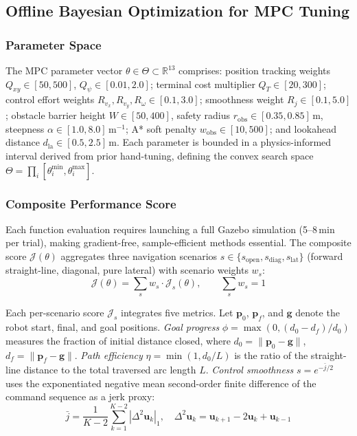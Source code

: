 \documentclass[conference]{IEEEtran}
\begin{document}
\subsection{Offline Bayesian Optimization for MPC Tuning}
\label{sec:offline-bo}

\subsubsection{Parameter Space}

The MPC parameter vector $\theta \in \Theta \subset \mathbb{R}^{13}$ comprises: position tracking weights $Q_{xy} \in [50, 500]$, $Q_\psi \in [0.01, 2.0]$; terminal cost multiplier $Q_T \in [20, 300]$; control effort weights $R_{v_x}, R_{v_y}, R_\omega \in [0.1, 3.0]$; smoothness weight $R_j \in [0.1, 5.0]$; obstacle barrier height $W \in [50, 400]$, safety radius $r_{\text{obs}} \in [0.35, 0.85]\,\text{m}$, steepness $\alpha \in [1.0, 8.0]\,\text{m}^{-1}$; A* soft penalty $w_{\text{obs}} \in [10, 500]$; and lookahead distance $d_{\text{la}} \in [0.5, 2.5]\,\text{m}$. Each parameter is bounded in a physics-informed interval derived from prior hand-tuning, defining the convex search space $\Theta = \prod_i [\theta_i^{\min}, \theta_i^{\max}]$.

\subsubsection{Composite Performance Score}

Each function evaluation requires launching a full Gazebo simulation (5--8\,min per trial), making gradient-free, sample-efficient methods essential. The composite score $\mathcal{J}(\theta)$ aggregates three navigation scenarios $s \in \{s_{\text{open}}, s_{\text{diag}}, s_{\text{lat}}\}$ (forward straight-line, diagonal, pure lateral) with scenario weights $w_s$:
\begin{equation}
	\mathcal{J}(\theta) = \sum_{s} w_s \cdot \mathcal{J}_s(\theta), \qquad \sum_s w_s = 1
	\label{eq:agg-score}
\end{equation}

Each per-scenario score $\mathcal{J}_s$ integrates five metrics. Let $\mathbf{p}_0$, $\mathbf{p}_f$, and $\mathbf{g}$ denote the robot start, final, and goal positions. \textit{Goal progress} $\phi = \max(0, (d_0 - d_f)/d_0)$ measures the fraction of initial distance closed, where $d_0 = \|\mathbf{p}_0 - \mathbf{g}\|$, $d_f = \|\mathbf{p}_f - \mathbf{g}\|$. \textit{Path efficiency} $\eta = \min(1, d_0/L)$ is the ratio of the straight-line distance to the total traversed arc length $L$. \textit{Control smoothness} $s = e^{-\bar{j}/2}$ uses the exponentiated negative mean second-order finite difference of the command sequence as a jerk proxy:
\begin{equation}
	\bar{j} = \frac{1}{K-2}\sum_{k=1}^{K-2} |\Delta^2 \mathbf{u}_k|_1, \quad \Delta^2 \mathbf{u}_k = \mathbf{u}_{k+1} - 2\mathbf{u}_k + \mathbf{u}_{k-1}
	\label{eq:jerk}
\end{equation}
\end{document}
